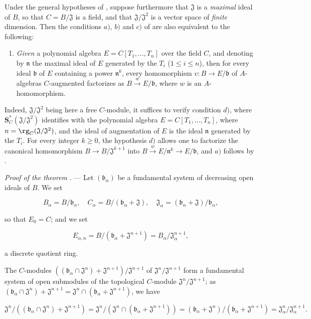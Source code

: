 \begin{remark}[19.5.5]
\label{0.19.5.5}
Under the general hypotheses of , suppose furthermore that $\mathfrak{J}$ is a \emph{maximal} ideal of $B$, so that $C=B/\mathfrak{J}$ is a field, and that $\mathfrak{J}/\mathfrak{J}^2$ is a vector space of \emph{finite} dimension.
Then the conditions $a)$, $b)$ and $c)$ of  are also equivalent to the following:
\begin{enumerate}
  \item[d)] \emph{Given} a polynomial algebra $E=C[T_1,\ldots,T_n]$ over the field $C$, and denoting by $\mathfrak{n}$ the maximal ideal of $E$ generated by the $T_i$ ($1\leq i\leq n$), then for every ideal $\mathfrak{b}$ of $E$ containing a power $\mathfrak{n}^k$, every homomorphism $v:B\to E/\mathfrak{b}$ of $A$-algebras $C$-augmented factorizes as $B\xrightarrow{w}E/\mathfrak{b}$, where $w$ is an $A$-homomorphism.
\end{enumerate}
Indeed, $\mathfrak{J}/\mathfrak{J}^2$ being here a free $C$-module, it suffices to verify condition $d)$, where $\mathbf{S}_C^*(\mathfrak{J}/\mathfrak{J}^2)$ identifies with the polynomial algebra $E=C[T_1,\ldots,T_n]$, where $n=\rg_C(\mathfrak{J}/\mathfrak{J}^2)$, and the ideal of augmentation of $E$ is the ideal $\mathfrak{n}$ generated by the $T_i$.
For every integer $k\geq 0$, the hypothesis $d)$ allows one to factorize the canonical homomorphism $B\to B/\mathfrak{J}^{k+1}$ into $B\xrightarrow{w}E/\mathfrak{n}^k\to E/\mathfrak{b}$, and $a)$ follows by .
\end{remark}

\begin{env}[19.5.6]
\label{0.19.5.6}
\emph{Proof of the theorem} . ---
Let $(\mathfrak{b}_\alpha)$ be a fundamental system of decreasing open ideals of $B$.
We set

\[
B_\alpha=B/\mathfrak{b}_\alpha, \quad C_\alpha=B/(\mathfrak{b}_\alpha+\mathfrak{J}), \quad \mathfrak{J}_\alpha=(\mathfrak{b}_\alpha+\mathfrak{J})/\mathfrak{b}_\alpha,
\]

so that $E_0=C$;
and we set

\[
E_{\alpha,n}=B/(\mathfrak{b}_\alpha+\mathfrak{J}^{n+1})=B_\alpha/\mathfrak{J}_\alpha^{n+1},
\]

a discrete quotient ring.
\end{env}

\begin{env}[19.5.6.1]
\label{0.19.5.6.1}
The $C$-modules $((\mathfrak{b}_\alpha\cap\mathfrak{J}^n)+\mathfrak{J}^{n+1})/\mathfrak{J}^{n+1}$ of $\mathfrak{J}^n/\mathfrak{J}^{n+1}$ form a fundamental system of open submodules of the topological $C$-module $\mathfrak{J}^n/\mathfrak{J}^{n+1}$;
as $(\mathfrak{b}_\alpha\cap\mathfrak{J}^n)+\mathfrak{J}^{n+1}=\mathfrak{J}^n\cap(\mathfrak{b}_\alpha+\mathfrak{J}^{n+1})$, we have

\[
\mathfrak{J}^n/((\mathfrak{b}_\alpha\cap\mathfrak{J}^n)+\mathfrak{J}^{n+1})=\mathfrak{J}^n/(\mathfrak{J}^n\cap(\mathfrak{b}_\alpha+\mathfrak{J}^{n+1}))=(\mathfrak{b}_\alpha+\mathfrak{J}^n)/(\mathfrak{b}_\alpha+\mathfrak{J}^{n+1})=\mathfrak{J}_\alpha^n/\mathfrak{J}_\alpha^{n+1}.
\]

\end{env}

